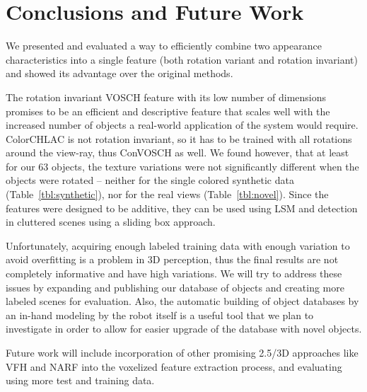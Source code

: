 \documentclass[conference]{sty/IEEEtran}
\begin{document}
\section{Conclusions and Future Work}
\label{sec:conclusion}

We presented and evaluated a way to efficiently combine two
appearance characteristics into a single feature (both rotation
variant and rotation invariant) and showed its advantage over
the original methods.

The rotation invariant VOSCH feature with its low number of dimensions
promises to be an efficient and descriptive feature that scales well with
the increased number of objects a real-world application of the system would
require. ColorCHLAC is not rotation invariant, so it has to be trained with
all rotations around the view-ray, thus ConVOSCH as well. We found
however, that at least for our 63 objects, the texture variations
were not significantly different when the objects were rotated
-- neither for the single colored synthetic data (Table~\ref{tbl:synthetic}),
nor for the real views (Table~\ref{tbl:novel}).
Since the features were designed to be additive, they can be used using
LSM and detection in cluttered scenes using a sliding box approach.

Unfortunately, acquiring enough labeled training data with enough variation
to avoid overfitting is a problem in 3D perception, thus the final results are
not completely informative and have high variations.
We will try to address these issues by expanding and publishing our database of objects
and creating more labeled scenes for evaluation.
Also, the automatic building of object databases by an in-hand modeling by the
robot itself is a useful tool that we plan to investigate in order to allow for
easier upgrade of the database with novel objects.

Future work will include incorporation of other promising 2.5/3D approaches like VFH and NARF
into the voxelized feature extraction process, and evaluating using more test and training data.






\end{document}
